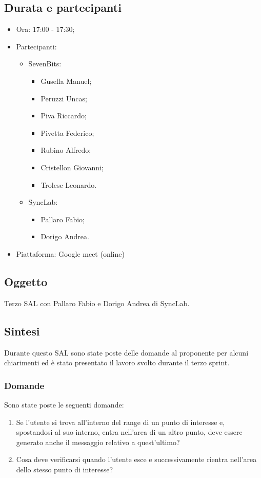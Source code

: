 \documentclass[10pt]{article}
\begin{document}
\subsection{Durata e partecipanti}
\begin{itemize}
\item Ora: 17:00 - 17:30;
\item Partecipanti: 	
	\begin{itemize}
            \item SevenBits:
            \begin{itemize}
	              \item Gusella Manuel;
                    \item Peruzzi Uncas;
                    \item Piva Riccardo;
                    \item Pivetta Federico;
                    \item Rubino Alfredo;
                    \item Cristellon Giovanni;
                    \item Trolese Leonardo.
	    \end{itemize}
            \item SyncLab:
            \begin{itemize}
                \item Pallaro Fabio;
                \item Dorigo Andrea.
            \end{itemize}
        \end{itemize}
\item Piattaforma: Google meet (online)
\end{itemize}

\subsection{Oggetto}
Terzo SAL con Pallaro Fabio e Dorigo Andrea di SyncLab.

\subsection{Sintesi}
Durante questo SAL sono state poste delle domande al proponente per alcuni chiarimenti ed è stato presentato il lavoro svolto durante il terzo sprint.

    \subsubsection{Domande}
    Sono state poste le seguenti domande:
    \begin{enumerate}
        \item Se l'utente si trova all'interno del range di un punto di interesse e, spostandosi al suo interno, entra nell'area di un altro punto, deve essere generato anche il messaggio relativo a quest'ultimo?
        \item Cosa deve verificarsi quando l'utente esce e successivamente rientra nell'area dello stesso punto di interesse?
    \end{enumerate}
\end{document}
